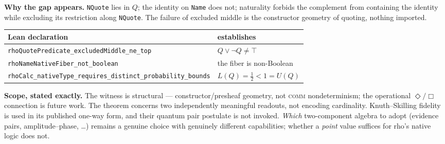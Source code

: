 \documentclass[11pt]{article}
\newcommand{\code}[1]{\texttt{#1}}
\begin{document}
\vspace{6pt}
\noindent\textbf{Why the gap appears.}  \code{NQuote} lies in $Q$; the
identity on \code{Name} does not; naturality forbids the complement from
containing the identity while excluding its restriction along
\code{NQuote}.  The failure of excluded middle is the constructor
geometry of quoting, nothing imported.

\vspace{6pt}
\begin{center}
\small
\begin{tabular}{@{}ll@{}}
\toprule
Lean declaration & establishes \\
\midrule
\code{rhoQuotePredicate\_excludedMiddle\_ne\_top} &
  $Q \lor \lnot Q \ne \top$ \\
\code{rhoNameNativeFiber\_not\_boolean} &
  the fiber is non-Boolean \\
\code{rhoCalc\_nativeType\_requires\_distinct\_probability\_bounds} &
  $L(Q)=\tfrac12 < 1 = U(Q)$ \\
\bottomrule
\end{tabular}
\end{center}

\vspace{6pt}
\noindent\textbf{Scope, stated exactly.}  The witness is structural ---
constructor/presheaf geometry, not \textsc{comm} nondeterminism; the
operational $\Diamond/\Box$ connection is future work.  The theorem
concerns two independently meaningful readouts, not encoding
cardinality.  Knuth--Skilling fidelity is used in its published one-way
form, and their quantum pair postulate is not invoked.  \emph{Which}
two-component algebra to adopt (evidence pairs, amplitude--phase, \dots)
remains a genuine choice with genuinely different capabilities; whether
a \emph{point} value suffices for rho's native logic does not.
\end{document}
